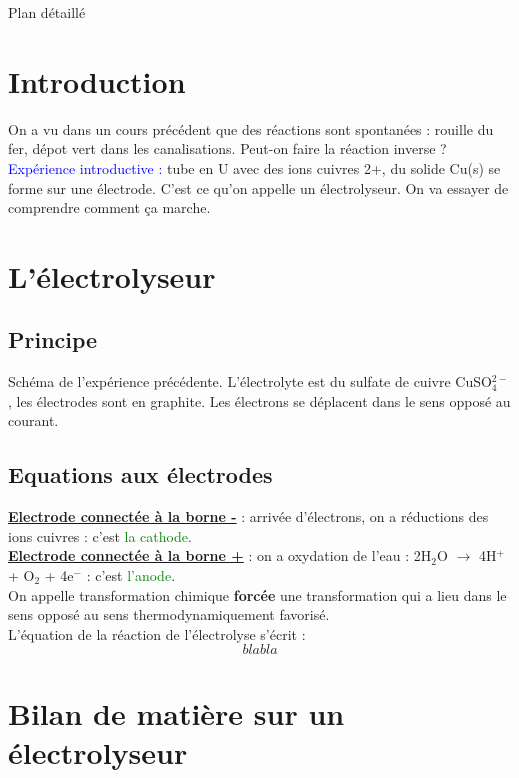 \begin{reportBlock}{Plan détaillé}
\section*{Introduction}
On a vu dans un cours précédent que des réactions sont spontanées : rouille du fer, dépot vert dans les canalisations. Peut-on faire la réaction inverse ?\\
\textcolor{blue}{Expérience introductive :} tube en U avec des ions cuivres 2+, du solide Cu(s) se forme sur une électrode. C'est ce qu'on appelle un électrolyseur. On va essayer de comprendre comment ça marche.

\section{L'électrolyseur}
\subsection{Principe}
Schéma de l'expérience précédente. L'électrolyte est du sulfate de cuivre CuSO$_4^{2-}$, les électrodes sont en graphite. Les électrons se déplacent dans le sens opposé au courant.

\subsection{Equations aux électrodes}
\underline{\textbf{Electrode connectée à la borne -}} : arrivée d'électrons, on a réductions des ions cuivres : c'est \textcolor{green}{la cathode}.\\

\underline{\textbf{Electrode connectée à la borne +}} : on a oxydation de l'eau : 2H$_2$O $\rightarrow$ 4H$^+$ + O$_2$ + 4e$^-$ : c'est \textcolor{green}{l'anode}.\\

On appelle transformation chimique \textbf{forcée} une transformation qui a lieu dans le sens opposé au sens thermodynamiquement favorisé.\\

L'équation de la réaction de l'électrolyse s'écrit : 
\begin{equation}
blabla
\end{equation}

\section{Bilan de matière sur un électrolyseur}

\end{reportBlock}
